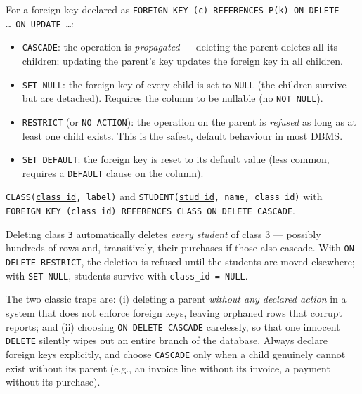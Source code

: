 \documentclass[11pt]{article}
\begin{document}
\begin{propriete}
For a foreign key declared as \texttt{FOREIGN KEY (c) REFERENCES P(k) ON DELETE \dots\ ON UPDATE \dots}:
\begin{itemize}
\item \texttt{CASCADE}: the operation is \emph{propagated} — deleting the parent deletes all its children; updating the parent's key updates the foreign key in all children.
\item \texttt{SET NULL}: the foreign key of every child is set to \texttt{NULL} (the children survive but are detached). Requires the column to be nullable (no \texttt{NOT NULL}).
\item \texttt{RESTRICT} (or \texttt{NO ACTION}): the operation on the parent is \emph{refused} as long as at least one child exists. This is the safest, default behaviour in most DBMS.
\item \texttt{SET DEFAULT}: the foreign key is reset to its default value (less common, requires a \texttt{DEFAULT} clause on the column).
\end{itemize}
\end{propriete}

\begin{exemplebox}
\texttt{CLASS(\underline{class\_id}, label)} and \texttt{STUDENT(\underline{stud\_id}, name, class\_id)} with \texttt{FOREIGN KEY (class\_id) REFERENCES CLASS ON DELETE CASCADE}.\par
Deleting class \texttt{3} automatically deletes \emph{every student} of class 3 — possibly hundreds of rows and, transitively, their purchases if those also cascade. With \texttt{ON DELETE RESTRICT}, the deletion is refused until the students are moved elsewhere; with \texttt{SET NULL}, students survive with \texttt{class\_id = NULL}.
\end{exemplebox}

\begin{attention}
The two classic traps are: (i) deleting a parent \emph{without any declared action} in a system that does not enforce foreign keys, leaving orphaned rows that corrupt reports; and (ii) choosing \texttt{ON DELETE CASCADE} carelessly, so that one innocent \texttt{DELETE} silently wipes out an entire branch of the database. Always declare foreign keys explicitly, and choose \texttt{CASCADE} only when a child genuinely cannot exist without its parent (e.g., an invoice line without its invoice, a payment without its purchase).
\end{attention}
\end{document}
